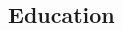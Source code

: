 \documentclass[10pt]{article} %
\begin{document}
\begin{paracol}{2}





\vspace{-\baselineskip}\medskip %


\section{Education}







\begin{supertabular}{rl} %
	
	
	

\end{supertabular}
\end{paracol}
\end{document}
